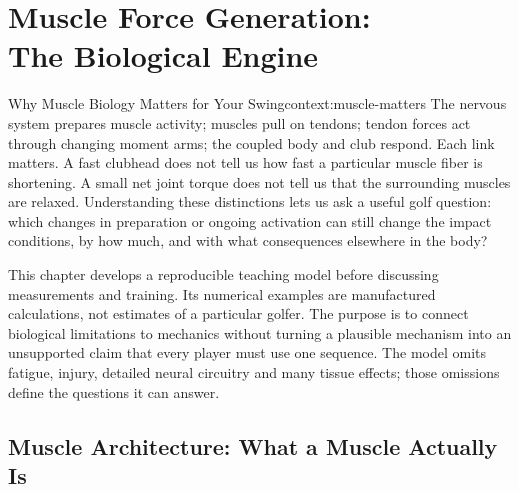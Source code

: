 \chapter[Muscle Force Generation: The Biological Engine]{Muscle Force Generation:\\The Biological Engine}
\label{ch:muscle-force-generation}
\raggedbottom
{}

\begin{laymansbox}{Why Muscle Biology Matters for Your Swing}{context:muscle-matters}
The nervous system prepares muscle activity; muscles pull on tendons; tendon forces act through changing moment arms; the coupled body and club respond. Each link matters. A fast clubhead does not tell us how fast a particular muscle fiber is shortening. A small net joint torque does not tell us that the surrounding muscles are relaxed. Understanding these distinctions lets us ask a useful golf question: which changes in preparation or ongoing activation can still change the impact conditions, by how much, and with what consequences elsewhere in the body?
\end{laymansbox}

This chapter develops a reproducible teaching model before discussing measurements and training. Its numerical examples are manufactured calculations, not estimates of a particular golfer. The purpose is to connect biological limitations to mechanics without turning a plausible mechanism into an unsupported claim that every player must use one sequence. The model omits fatigue, injury, detailed neural circuitry and many tissue effects; those omissions define the questions it can answer.

\section{Muscle Architecture: What a Muscle Actually Is}

